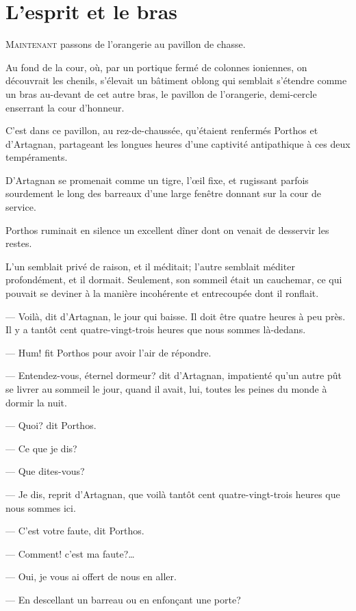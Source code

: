 \chapter{L'esprit et le bras}

\lettrine{M}{aintenant} passons de l'orangerie au pavillon de chasse.

\zz
Au fond de la cour, où, par un portique fermé de colonnes ioniennes, on découvrait les chenils, s'élevait un bâtiment oblong qui semblait s'étendre comme un bras au-devant de cet autre bras, le pavillon de l'orangerie, demi-cercle enserrant la cour d'honneur.

C'est dans ce pavillon, au rez-de-chaussée, qu'étaient renfermés Porthos et d'Artagnan, partageant les longues heures d'une captivité antipathique à ces deux tempéraments.

D'Artagnan se promenait comme un tigre, l'œil fixe, et rugissant parfois sourdement le long des barreaux d'une large fenêtre donnant sur la cour de service.

Porthos ruminait en silence un excellent dîner dont on venait de desservir les restes.

L'un semblait privé de raison, et il méditait; l'autre semblait méditer profondément, et il dormait. Seulement, son sommeil était un cauchemar, ce qui pouvait se deviner à la manière incohérente et entrecoupée dont il ronflait.

— Voilà, dit d'Artagnan, le jour qui baisse. Il doit être quatre heures à peu près. Il y a tantôt cent quatre-vingt-trois heures que nous sommes là-dedans.

— Hum! fit Porthos pour avoir l'air de répondre.

— Entendez-vous, éternel dormeur? dit d'Artagnan, impatienté qu'un autre pût se livrer au sommeil le jour, quand il avait, lui, toutes les peines du monde à dormir la nuit.

— Quoi? dit Porthos.

— Ce que je dis?

— Que dites-vous?

— Je dis, reprit d'Artagnan, que voilà tantôt cent quatre-vingt-trois heures que nous sommes ici.

— C'est votre faute, dit Porthos.

— Comment! c'est ma faute?\dots

— Oui, je vous ai offert de nous en aller.

— En descellant un barreau ou en enfonçant une porte?

